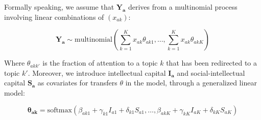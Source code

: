 \documentclass{article}
\begin{document}
Formally speaking, we assume that $\bm{Y_{a}}$ derives from a multinomial process involving linear combinations of $(x_{ak})$:

\begin{equation}
    \bm{Y_a} \sim \text{multinomial}(\sum_{k=1}^{K} x_{ak}\theta_{ak1} ,\dots,\sum_{k=1}^{K}x_{ak}\theta_{akK})
\end{equation}

Where $\theta_{akk'}$ is the fraction of attention to a topic $k$ that has been redirected to a topic $k'$. %
Moreover, we introduce intellectual capital $\bm{I_a}$ and social-intellectual capital $\bm{S_a}$ as covariates for transfers $\theta$ in the model, through a generalized linear model:

\begin{equation}
    \bm{\theta_{ak}} = \text{softmax}\left(\beta_{ak1} + \gamma_{k1} I_{a1} + \delta_{k1} S_{a1}, \dots,\beta_{akK} + \gamma_{kK} I_{aK} + \delta_{kK} S_{aK}\right)
    \label{eq:glm}
\end{equation}
\end{document}

